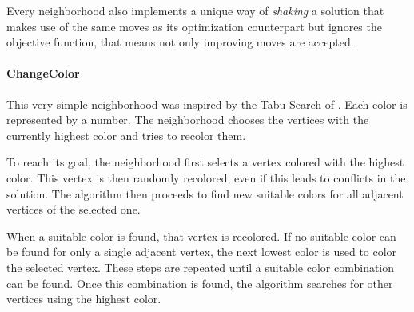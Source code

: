\documentclass[paper = a4, fontsize = 10pt]{scrartcl}
\begin{document}
Every neighborhood also implements a unique way of \emph{shaking} a solution that makes use of the same moves as its optimization counterpart but ignores the objective function, that means not only improving moves are accepted.


\paragraph{ChangeColor}
This very simple neighborhood was inspired by the Tabu Search of \citet*{Noronha2006}. Each color is represented by a number. The neighborhood chooses the vertices with the currently highest color and tries to recolor them.


To reach its goal, the neighborhood first selects a vertex colored with the highest color. This vertex is then randomly recolored, even if this leads to conflicts in the solution. The algorithm then proceeds to find new suitable colors for all adjacent vertices of the selected one.


When a suitable color is found, that vertex is recolored. If no suitable color can be found for only a single adjacent vertex, the next lowest color is used to color the selected vertex. These steps are repeated until a suitable color combination can be found. Once this combination is found, the algorithm searches for other vertices using the highest color.

\end{document}
